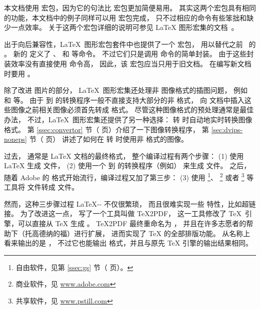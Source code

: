 本文档使用  宏包，因为它的句法比  宏包更加简便易用。
其实这两个宏包具有相同的功能，本文档中的例子同样可以用  宏包完成，
只不过相应的命令有些笨拙和缺少一点效率。
关于这两个宏包详细的说明可参见 \LaTeX{} 图形宏集的文档~\cite{grfguide}。

出于向后兼容性，\LaTeX\ 图形宏包套件中也提供了一个  宏包，
用以替代之前 \LaTeXe\ 的 。
新的 定义了 、 和  等命令。
不过它们只是调用  命令的简单封装。
由于这些封装效率没有直接使用  命令高，
因此，该  宏包应当只用于旧文档。
在编写新文档时要用 。

除了改进  图片的部分，
\LaTeX{}~图形宏集还处理非  图像格式的插图问题，
例如 和 等。
由于  到  的转换程序一般不直接支持大部分的非 格式，
向  文档中插入这些图像之前相关图像必须首先转成  格式。
尽管这种图像格式的预处理通常是最佳办法，
不过，\LaTeX\ 图形宏集还提供了另一种选择： 转  时自动地实时转换图像格式。
第 \ref{ssec:convertor} 节（\pageref{ssec:convertor} 页）介绍了一下图像转换程序，
第 \ref{sec:dvips-noneps} 节（\pageref{sec:dvips-noneps} 页） 讲述了如何在  转  时使用非  格式的图像。

过去， 通常是 \LaTeX{} 文档的最终格式，
\marginpar{\pdfTeX}
整个编译过程有两个步骤：
(1) 使用 \LaTeX{} 生成  文件，
(2) 使用一个  到  的转换程序（例如） 来生成  文件。
之后，随着 Adobe 的  格式开始流行，编译过程又加了第三步：
(3) 使用 
\footnote{自由软件，见第 \ref{ssec:gs} 节（\pageref{ssec:gs} 页）。}、
\footnote{商业软件，见 \url{www.adobe.com}}
或者 
\footnote{共享软件，见 \url{www.pstill.com}}
等工具将  文件转成  文件。

然而，这种三步骤过程 \LaTeX-- 不仅很繁琐，
而且很难实现一些  特性，比如超链接。
为了改进这一点，\HanTheThanh{} 写了一个工具叫做 \TeX2PDF，
这一工具修改了 \TeX\ 引擎，可以直接从 \TeX{} 生成 。
\TeX2PDF 最终重命名为 \pdfTeX，
并且在许多志愿者的帮助下（托高德纳的福）进行扩展，
进而实现了 \TeX{} 的全部排版功能。
\pdfTeX 从名称上看来输出的是 ，
不过它也能输出  格式，并且与原先 \TeX{} 引擎的输出结果相同。

